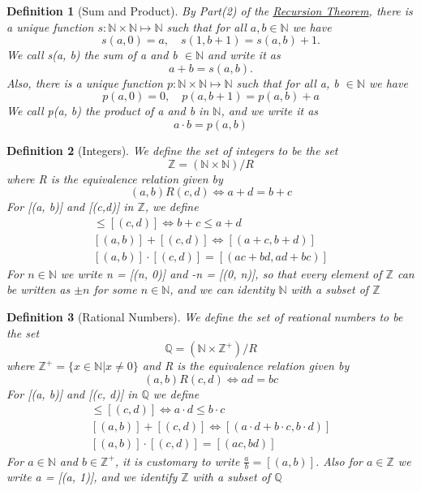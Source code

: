 \documentclass[11pt, oneside]{book}
\theoremstyle{break}
\newtheorem{defn}{Definition}[section]
\newcommand{\bb}[1]{\mathbb{#1}}		%
\begin{document}
\begin{defn}[Sum and Product]
	By Part(2) of the \hyperref[recursion_theorem]{Recursion Theorem}, there is a unique function $s: \bb{N} \times \bb{N} \mapsto \bb{N}$ such that for all $a, b \in \bb{N}$ we have
	\[
		s(a, 0) = a, \quad s(1, b + 1) = s(a, b) + 1.
	\]
	We call s(a, b) the sum of a and b $\in \bb{N}$ and write it as
	\[
		a + b = s(a, b).
	\]
	Also, there is a unique function $p: \bb{N} \times \bb{N} \mapsto \bb{N}$ such that for all a, b $\in \bb{N}$ we have
	\[
		p(a, 0) = 0, \quad p(a, b + 1) = p(a, b) + a
	\]
	We call p(a, b) the product of a and b in $\bb{N}$, and we write it as
	\[
		a \cdot b = p(a, b)
	\]
\end{defn}

\begin{defn}[Integers]
	We define the set of integers to be the set
	\[
		\bb{Z} = (\bb{N} \times \bb{N})/R
	\]
	where R is the equivalence relation given by
	\[
		(a, b)R(c,d) \iff a + d = b + c
	\]
	For [(a, b)] and [(c,d)] in $\bb{Z}$, we define
	\begin{gather*}
		[(a, b)] \leq [(c, d)] \iff b + c \leq a + d \\
		[(a, b)] + [(c ,d)] \iff [(a + c, b + d)] \\
		[(a, b)] \cdot [(c, d)] = [(ac + bd, ad + bc)]
	\end{gather*}
	For $n \in \bb{N}$ we write n = [(n, 0)] and -n = [(0, n)], so that every element of $\bb{Z}$ can be written as $\pm n$ for some $n \in \bb{N}$, and we can identity $\bb{N}$ with a subset of $\bb{Z}$
\end{defn}

\begin{defn}[Rational Numbers]
	We define the set of reational numbers to be the set
	\[
		\bb{Q} = (\bb{N} \times \bb{Z}^+)/R
	\]
	where $\bb{Z}^+ = \{x \in \bb{N} | x \neq 0\}$ and R is the equivalence relation given by
	\[
		(a, b)R(c, d) \iff ad = bc
	\]
	For [(a, b)] and [(c, d)] in $\bb{Q}$ we define
	\begin{gather*}
		[(a, b)] \leq [(c, d)] \iff a \cdot d \leq b \cdot c \\
		[(a, b)] + [(c ,d)] \iff [(a \cdot d + b \cdot c, b \cdot d)] \\
		[(a, b)] \cdot [(c, d)] = [(ac, bd)]
	\end{gather*}
	For $a \in \bb{N}$ and $b \in \bb{Z}^+$, it is customary to write $\frac{a}{b} = [(a, b)]$. Also for $a \in \bb{Z}$ we write a = [(a, 1)], and we identify $\bb{Z}$ with a subset of $\bb{Q}$
\end{defn}
\end{document}
